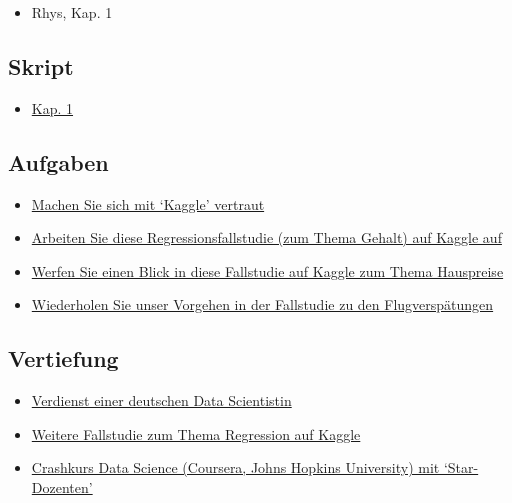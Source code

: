 \documentclass[
]{book}
\providecommand{\tightlist}{%
  \setlength{\itemsep}{0pt}\setlength{\parskip}{0pt}}
\begin{document}
\begin{itemize}
\tightlist
\item
  Rhys, Kap. 1
\end{itemize}

\hypertarget{skript}{%
\subsection{Skript}\label{skript}}

\begin{itemize}
\tightlist
\item
  \href{}{Kap. 1}
\end{itemize}

\hypertarget{aufgaben}{%
\subsection{Aufgaben}\label{aufgaben}}

\begin{itemize}
\tightlist
\item
  \href{https://www.kaggle.com/}{Machen Sie sich mit `Kaggle' vertraut}
\item
  \href{https://www.kaggle.com/pranjalpandey12/performing-simple-linear-regression-in-r}{Arbeiten Sie diese Regressionsfallstudie (zum Thema Gehalt) auf Kaggle auf}
\item
  \href{https://www.kaggle.com/lazaro97/data-preprocessing-and-linear-regression-with-r}{Werfen Sie einen Blick in diese Fallstudie auf Kaggle zum Thema Hauspreise}
\item
  \href{https://data-se.netlify.app/2021/03/10/fallstudie-modellierung-von-flugversp\%C3\%A4tungen/}{Wiederholen Sie unser Vorgehen in der Fallstudie zu den Flugverspätungen}
\end{itemize}

\hypertarget{vertiefung}{%
\subsection{Vertiefung}\label{vertiefung}}

\begin{itemize}
\tightlist
\item
  \href{https://www.zeit.de/arbeit/2020-10/data-scientist-gehalt-geldanlage-programmieren-kontoauszug}{Verdienst einer deutschen Data Scientistin}
\item
  \href{https://www.kaggle.com/micahshull/r-bike-sharing-linear-regression}{Weitere Fallstudie zum Thema Regression auf Kaggle}
\item
  \href{https://www.coursera.org/learn/data-science-course}{Crashkurs Data Science (Coursera, Johns Hopkins University) mit `Star-Dozenten'}
\end{itemize}
\end{document}
